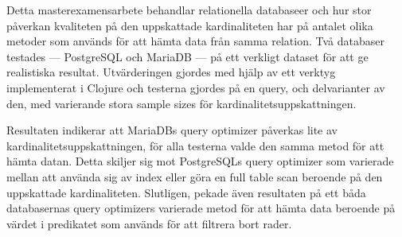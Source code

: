 Detta masterexamensarbete behandlar relationella databaseer och hur stor
påverkan kvaliteten på den uppskattade kardinaliteten har på antalet olika
metoder som används för att hämta data från samma relation. Två databaser
testades --- PostgreSQL och MariaDB --- på ett verkligt dataset för att ge
realistiska resultat. Utvärderingen gjordes med hjälp av ett verktyg
implementerat i Clojure och testerna gjordes på en query, och delvarianter av
den, med varierande stora sample sizes för kardinalitetsuppskattningen.

Resultaten indikerar att MariaDBs query optimizer påverkas lite av
kardinalitetsuppskattningen, för alla testerna valde den samma metod för att
hämta datan. Detta skiljer sig mot PostgreSQLs query optimizer som varierade
mellan att använda sig av index eller göra en full table scan beroende på den
uppskattade kardinaliteten. Slutligen, pekade även resultaten på ett båda
databasernas query optimizers varierade metod för att hämta data beroende på
värdet i predikatet som används för att filtrera bort rader.